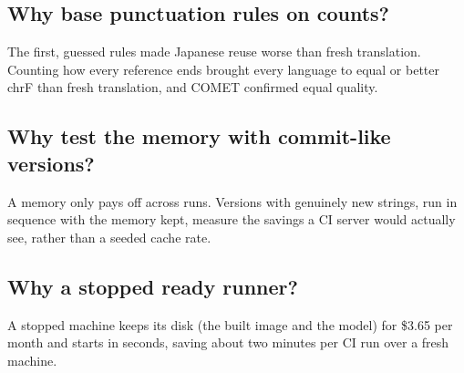 \subsection{Why base punctuation rules on counts?}
The first, guessed rules made Japanese reuse worse than fresh translation. Counting how every reference ends brought
every language to equal or better chrF than fresh translation, and COMET confirmed equal quality.

\subsection{Why test the memory with commit-like versions?}
A memory only pays off across runs. Versions with genuinely new strings, run in sequence with the memory kept, measure
the savings a CI server would actually see, rather than a seeded cache rate.

\subsection{Why a stopped ready runner?}
A stopped machine keeps its disk (the built image and the model) for \$3.65 per month and starts in seconds, saving about
two minutes per CI run over a fresh machine.
